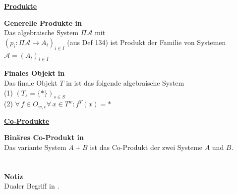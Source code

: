 \begin{multicols}{2}

\textbf{\underline{Produkte}} 

\textbf{ Generelle Produkte in \syssig} \\
Das algebraische System $\Pi \mathcal{A}$ mit \\ $(p_i: \Pi \mathcal{A} \rightarrow A_i)_{i \in I}$ (aus Def 134) ist Produkt der Familie von Systemen $\mathcal{A} = (A_i)_{i \in I}$


\textbf{ Finales Objekt in \syssig} \\
Das finale Objekt $T$ in \syssig ist das folgende algebraische System \\
(1) $(T_s = \{*\})_{s \in S}$ \\
(2) $\forall \, f \in O_{w,v} \forall \, x \in T^w: f^T(x)=*$

\columnbreak

\textbf{\underline{Co-Produkte}} 

\textbf{ Binäres Co-Produkt in \syssig} \\
Das variante System $A + B$ ist das Co-Produkt der zwei Systeme $A$ und $B$.
\\ 
\\
\\
\textbf{Notiz} \\
Dualer Begriff in .


\end{multicols}



